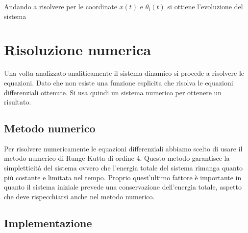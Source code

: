 \documentclass[12pt]{article}
\begin{document}
Andando a risolvere per le coordinate $x(t)$ e $\theta_i(t)$ si ottiene l'evoluzione del sistema

\section{Risoluzione numerica}

Una volta analizzato analiticamente il sistema dinamico si procede a risolvere le equazioni. Dato che non esiste una funzione esplicita che risolva le equazioni differenziali ottenute. Si usa quindi un sistema numerico per ottenere un risultato.

\subsection{Metodo numerico}

Per risolvere numericamente le equazioni differenziali abbiamo scelto di usare il metodo numerico di Runge-Kutta di ordine 4. Questo metodo garantisce la simpletticità del sistema ovvero che l'energia totale del sistema rimanga quanto più costante e limitata nel tempo. Proprio quest'ultimo fattore è importante in quanto il sistema iniziale prevede una conservazione dell'energia totale, aspetto che deve rispecchiarsi anche nel metodo numerico.

\subsection{Implementazione}



\begingroup
\obeylines
\inputminted[fontsize=\scriptsize, linenos, breaklines=true, xleftmargin=0.75cm, frame=lines]{cython}{code/Python/file_1.pyx}
\endgroup

\newpage
\end{document}
